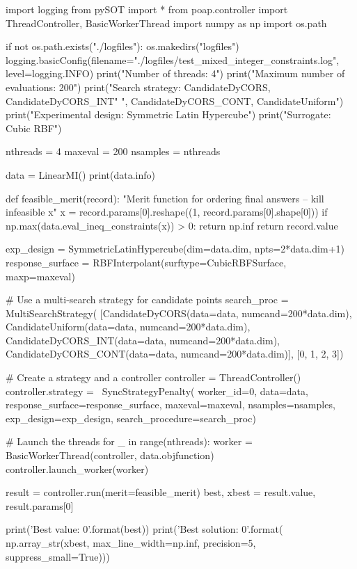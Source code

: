 \documentclass[]{article}
\begin{document}
\begin{python}
import logging
from pySOT import *
from poap.controller import ThreadController, BasicWorkerThread
import numpy as np
import os.path

if not os.path.exists("./logfiles"):
    os.makedirs("logfiles")
logging.basicConfig(filename="./logfiles/test_mixed_integer_constraints.log",
                    level=logging.INFO)
print("Number of threads: 4")
print("Maximum number of evaluations: 200")
print("Search strategy: CandidateDyCORS, CandidateDyCORS_INT"
      ", CandidateDyCORS_CONT, CandidateUniform")
print("Experimental design: Symmetric Latin Hypercube")
print("Surrogate: Cubic RBF")

nthreads = 4
maxeval = 200
nsamples = nthreads

data = LinearMI()
print(data.info)

def feasible_merit(record):
    "Merit function for ordering final answers -- kill infeasible x"
    x = record.params[0].reshape((1, record.params[0].shape[0]))
    if np.max(data.eval_ineq_constraints(x)) > 0:
        return np.inf
    return record.value

exp_design = SymmetricLatinHypercube(dim=data.dim, npts=2*data.dim+1)
response_surface = RBFInterpolant(surftype=CubicRBFSurface, maxp=maxeval)


# Use a multi-search strategy for candidate points
search_proc = MultiSearchStrategy(
    [CandidateDyCORS(data=data, numcand=200*data.dim),
     CandidateUniform(data=data, numcand=200*data.dim),
     CandidateDyCORS_INT(data=data, numcand=200*data.dim),
     CandidateDyCORS_CONT(data=data, numcand=200*data.dim)],
    [0, 1, 2, 3])

# Create a strategy and a controller
controller = ThreadController()
controller.strategy = \
    SyncStrategyPenalty( 
        worker_id=0, data=data,
        response_surface=response_surface,
        maxeval=maxeval, nsamples=nsamples,
        exp_design=exp_design,
        search_procedure=search_proc)

# Launch the threads
for _ in range(nthreads): 
    worker = BasicWorkerThread(controller, data.objfunction)
    controller.launch_worker(worker)

result = controller.run(merit=feasible_merit)
best, xbest = result.value, result.params[0]

print('Best value: {0}'.format(best))
print('Best solution: {0}'.format(
    np.array_str(xbest, max_line_width=np.inf,
                 precision=5, suppress_small=True)))
\end{python}
\end{document}
